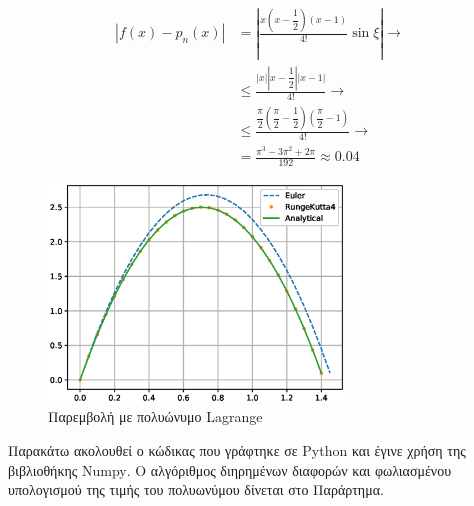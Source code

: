 \documentclass[assignment4.tex]{subfiles}
\begin{document}
\begin{equation}
\begin{split}
|f(x)-p_n(x)|&=\left|\frac{x(x-\dfrac{1}{2})(x-1)}{4!}\sin\xi\right| \rightarrow \\
&\leq \frac{|x||x-\dfrac{1}{2}||x-1|}{4!}\rightarrow \\
& \leq \frac{\dfrac{\pi}{2} (\dfrac{\pi}{2}-\dfrac{1}{2})(\dfrac{\pi}{2}-1)}{4!} \rightarrow \\
&=\frac{\pi^3-3\pi^2+2\pi}{192} \approx 0.04
\end{split}
\label{eq:actual_error}
\end{equation}

\begin{figure}[hp]
	\includegraphics[width=0.7\textwidth]{ex2b.eps}
	\centering
	\caption{Παρεμβολή με πολυώνυμο \textlatin{Lagrange}}
	\label{fig:ex2_error}
\end{figure}

Παρακάτω ακολουθεί ο κώδικας που γράφτηκε σε \textlatin{Python} και έγινε χρήση της βιβλιοθήκης \textlatin{Numpy}. Ο αλγόριθμος διηρημένων διαφορών και φωλιασμένου υπολογισμού της τιμής του πολυωνύμου δίνεται στο Παράρτημα.

\end{document}
